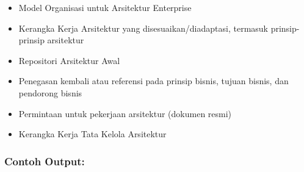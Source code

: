 \begin{itemize}
	\item Model Organisasi untuk Arsitektur Enterprise
	\item Kerangka Kerja Arsitektur yang disesuaikan/diadaptasi, termasuk prinsip-prinsip arsitektur
	\item Repositori Arsitektur Awal
	\item Penegasan kembali atau referensi pada prinsip bisnis, tujuan bisnis, dan pendorong bisnis
	\item Permintaan untuk pekerjaan arsitektur (dokumen resmi)
	\item Kerangka Kerja Tata Kelola Arsitektur
\end{itemize}

\subsubsection{Contoh Output:}

